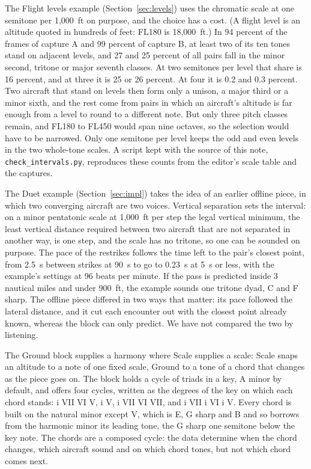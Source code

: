 \documentclass[11pt,letterpaper]{article}
\begin{document}
The Flight levels example (Section~\ref{sec:levels}) uses the chromatic scale at one semitone per 1,000~ft on purpose, and the choice has a cost. (A flight level is an altitude quoted in hundreds of feet: FL180 is 18,000~ft.) In 94 percent of the frames of capture A and 99 percent of capture B, at least two of its ten tones stand on adjacent levels, and 27 and 25 percent of all pairs fall in the minor second, tritone or major seventh classes. At two semitones per level that share is 16 percent, and at three it is 25 or 26 percent. At four it is 0.2 and 0.3 percent. Two aircraft that stand on levels then form only a unison, a major third or a minor sixth, and the rest come from pairs in which an aircraft's altitude is far enough from a level to round to a different note. But only three pitch classes remain, and FL180 to FL450 would span nine octaves, so the selection would have to be narrowed. Only one semitone per level keeps the odd and even levels in the two whole-tone scales. A script kept with the source of this note, \texttt{check\_intervals.py}, reproduces these counts from the editor's scale table and the captures.

The Duet example (Section~\ref{sec:impl}) takes the idea of an earlier offline piece, in which two converging aircraft are two voices. Vertical separation sets the interval: on a minor pentatonic scale at 1,000~ft per step the legal vertical minimum, the least vertical distance required between two aircraft that are not separated in another way, is one step, and the scale has no tritone, so one can be sounded on purpose. The pace of the restrikes follows the time left to the pair's closest point, from 2.5~s between strikes at 90~s to go to 0.23~s at 5~s or less, with the example's settings at 96 beats per minute. If the pass is predicted inside 3 nautical miles and under 900~ft, the example sounds one tritone dyad, C and F sharp. The offline piece differed in two ways that matter: its pace followed the lateral distance, and it cut each encounter out with the closest point already known, whereas the block can only predict. We have not compared the two by listening.

The Ground block supplies a harmony where Scale supplies a scale: Scale snaps an altitude to a note of one fixed scale, Ground to a tone of a chord that changes as the piece goes on. The block holds a cycle of triads in a key, A minor by default, and offers four cycles, written as the degrees of the key on which each chord stands: i VII VI V, i V, i VII VI VII, and i VII i VI i V. Every chord is built on the natural minor except V, which is E, G sharp and B and so borrows from the harmonic minor its leading tone, the G sharp one semitone below the key note. The chords are a composed cycle: the data determine when the chord changes, which aircraft sound and on which chord tones, but not which chord comes next.
\end{document}
